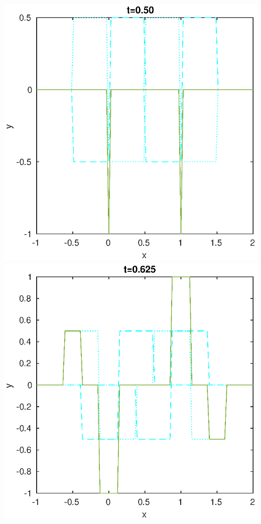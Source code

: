 \documentclass{jreport}
\begin{document}
\includegraphics[scale=0.3]{250.eps}
\includegraphics[scale=0.3]{2625.eps}
\end{document}
